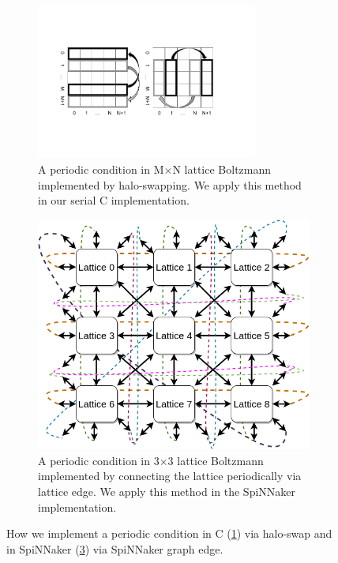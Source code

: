 \begin{figure}[htbp]

\begin{subfigure}[b]{1\textwidth}
       \centering
       \includegraphics[width=0.8\textwidth]{figures/haloswap.png}
       \caption{A periodic condition in M$\times$N lattice Boltzmann implemented by halo-swapping. We apply this method in our serial C implementation.}
       \label{fig:haloswap}
   \end{subfigure}
   \begin{subfigure}[b]{1\textwidth}
       \includegraphics[width=\textwidth]{figures/2dfabric.png}
       \caption{A periodic condition in 3$\times$3 lattice Boltzmann implemented by connecting the lattice periodically via lattice edge. We apply this method in the SpiNNaker implementation.}
       \label{fig:spinnaker_halo}
   \end{subfigure}
   \caption{How we implement a periodic condition in C (\ref{fig:haloswap}) via halo-swap and in SpiNNaker (\ref{fig:spinnaker_halo}) via SpiNNaker graph edge.}
\end{figure}

